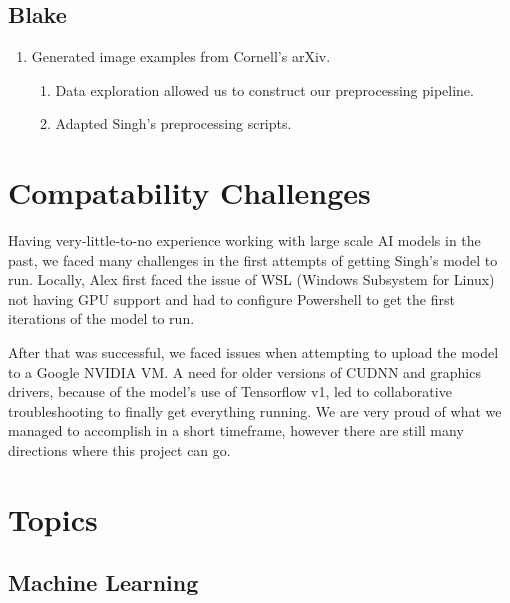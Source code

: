 \documentclass[12pt]{article}
\begin{document}
\begin{appendix}
    \subsection{Blake}
      \begin{enumerate}
        \item Generated image examples from Cornell's arXiv.
        \begin{enumerate}
          \item Data exploration allowed us to construct our preprocessing pipeline.
          \item Adapted Singh's preprocessing scripts.
        \end{enumerate}
      \end{enumerate}
    \section{Compatability Challenges}

      Having very-little-to-no experience working with large scale AI models in
      the past, we faced many challenges in the first attempts of getting
      Singh's model to run. Locally, Alex first faced the issue of WSL (Windows
      Subsystem for Linux) not having GPU support and had to configure
      Powershell to get the first iterations of the model to run.
      
      After that was successful, we faced issues when attempting to upload the
      model to a Google NVIDIA VM. A need for older versions of CUDNN and
      graphics drivers, because of the model's use of Tensorflow v1, led to
      collaborative troubleshooting to finally get everything running. We are
      very proud of what we managed to accomplish in a short timeframe, however
      there are still many directions where this project can go.
      \section{Topics}

      \subsection{Machine Learning}
      

\end{appendix}
\end{document}
